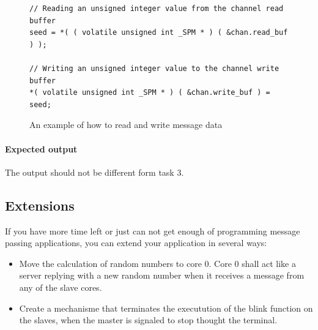 \documentclass[a4paper,fontsize=10pt,twoside,DIV15,BCOR12mm,headinclude=true,footinclude=false,pagesize,bibtotoc]{scrbook}
\begin{document}
\begin{figure}
\begin{Verbatim}[xleftmargin=1cm,xrightmargin=1cm,frame=single,framesep=3mm]
// Reading an unsigned integer value from the channel read buffer
seed = *( ( volatile unsigned int _SPM * ) ( &chan.read_buf ) );

// Writing an unsigned integer value to the channel write buffer
*( volatile unsigned int _SPM * ) ( &chan.write_buf ) = seed; 
\end{Verbatim}
\caption{\label{fig:msg_data}An example of how to read and write message data}
\end{figure}

\paragraph*{Expected output}
The output should not be different form task 3.

\subsection{Extensions}
If you have more time left or just can not get enough of programming message passing applications, you can extend your application  in several ways:
\begin{itemize}
\item Move the calculation of random numbers to core 0.
Core 0 shall act like a server replying with a new random number when it receives a message from any of the slave cores.
\item Create a mechanisme that terminates the executution of the blink function on the slaves, when the master is signaled to stop thought the terminal. 
\end{itemize}
\end{document}
